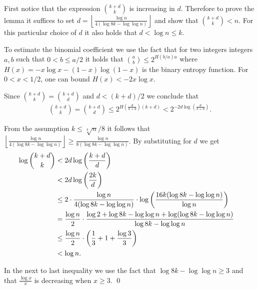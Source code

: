 \documentclass[runningheads,a4paper]{llncs}
\newenvironment{proofof}[1]{\noindent{\it Proof of #1. }} {{\qed}}
\begin{document}
\bigskip
\begin{proofof}{Lemma \ref{lm:lower_bound_d}}
First notice that the expression ${k+d \choose k}$ is increasing in $d$.
Therefore to prove the lemma it suffices to set $d = \left\lfloor \frac{\log n}{4 (\log 8k - \log \log n)} \right\rfloor$ 
and show that ${k +d \choose k} < n$.  For this particular choice of $d$ it also holds that $d < \log n \leq k$. 

To estimate the binomial coefficient we use the fact that for two integers integers $a, b$ 
such that $0 < b \leq a/2$ it holds that ${a \choose b} \leq 2^{H(b/a) a}$
where $H(x) = - x \log x - (1-x) \log (1-x)$ is the binary entropy function.
For $0<x<1/2$, one can bound $H(x) < -2x \log x$. 

Since ${k+d \choose k}= {k+d \choose d}$ and $d < (k + d)/2$ we conclude that
\begin{align*}
{k+d \choose k} = {k+d \choose d} \leq 2^{H\left(\frac{d}{k + d}\right)(k+d)} < 2^{-2d\log\left(\frac{d}{k + d}\right)}.
\end{align*}

From the assumption $k \leq \sqrt[4]{n}/8$ it follows 
that $\left\lfloor \frac{\log n}{4 (\log 8k - \log \log n)} \right\rfloor \ge \frac{\log n}{8 (\log 8k - \log \log n)}$.
By substituting for $d$ we get
\begin{align*}
\log {k + d \choose k}
        & < 2d \log\left(\frac{k + d}{d}\right) \cr
        & < 2d \log\left(\frac{2k}{d}\right) \cr
        & \le 2 \cdot \frac{\log n}{4(\log 8k - \log \log n)} \cdot \log \left(\frac{16k (\log 8k - \log \log n)}{\log n}\right) \cr
        & = \frac{\log n}{2} \cdot \frac{\log 2 + \log 8k - \log \log n + \log (\log 8k - \log \log n)}{\log 8k - \log \log n} \cr
        & \le \frac{\log n}{2} \cdot \left(\frac{1}{3} + 1 + \frac{\log 3}{3}\right) \cr
        & < \log n.
\end{align*}

In the next to last inequality we use the fact that $\log 8k - \log \log n \geq 3$ and that $\frac{\log x}{x}$ is decreasing 
when $x \geq 3$.
\end{proofof}
\end{document}

